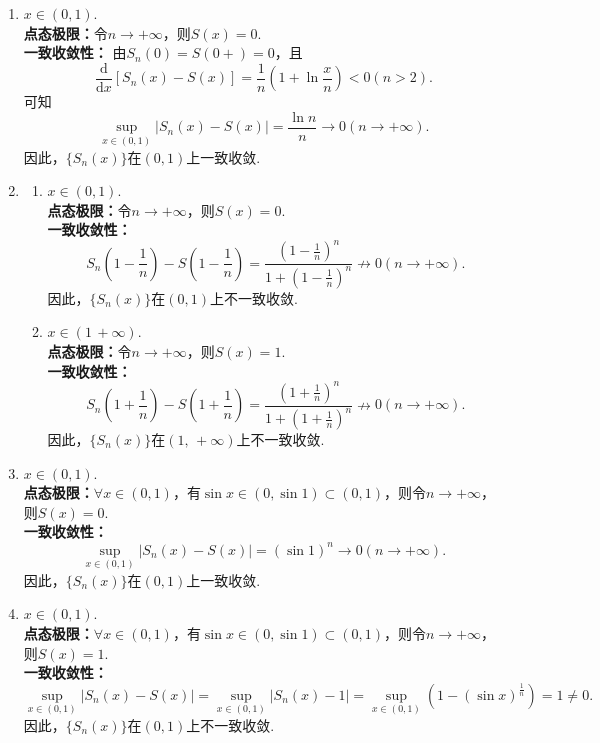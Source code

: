 \begin{enumerate}
\begin{solution}
\begin{enumerate}
        \item 
        $x\in(0,1).$\\
        \textbf{点态极限：}令$n\to+\infty$，则$S(x)=0$.\\
        \textbf{一致收敛性：}
        由$S_n(0)=S(0+)=0$，且
        \[
        \frac{\mathrm{d}}{\mathrm{d}x}\left[S_n(x)-S(x)\right]=\frac{1}{n}\left(1+\ln\frac{x}{n}\right)<0(n>2).
        \]
        可知
        \[
        \sup_{x\in(0,1)}\left|S_n(x)-S(x)\right|=\frac{\ln{n}}{n}\to 0(n\to+\infty).
        \]
        因此，$\{S_n(x)\}$在$(0,1)$上一致收敛.

        \item 
        \begin{enumerate}
        \item[i.] $x\in(0,1).$\\
        \textbf{点态极限：}令$n\to+\infty$，则$S(x)=0$.\\
        \textbf{一致收敛性：}
        \[
        S_n(1-\frac{1}{n})-S(1-\frac{1}{n})=\frac{\left(1-\frac{1}{n}\right)^n}{1+\left(1-\frac{1}{n}\right)^n}\nrightarrow 0(n\to+\infty).
        \]
        因此，$\{S_n(x)\}$在$(0,1)$上不一致收敛.
        \item[ii.] $x\in(1\,+\infty).$\\
        \textbf{点态极限：}令$n\to+\infty$，则$S(x)=1$.\\
        \textbf{一致收敛性：}	
        \[
        S_n(1+\frac{1}{n})-S(1+\frac{1}{n})=\frac{\left(1+\frac{1}{n}\right)^n}{1+\left(1+\frac{1}{n}\right)^n}\nrightarrow 0(n\to+\infty).
        \]
        因此，$\{S_n(x)\}$在$(1,\,+\infty)$上不一致收敛.
        \end{enumerate}

        \item 
        $x\in(0,1).$\\
        \textbf{点态极限：}$\forall x\in(0,1)$，有$\sin{x}\in(0,\sin{1})\subset (0,1)$，则令$n\to+\infty$，则$S(x)=0$.\\	
        \textbf{一致收敛性：}
        \[
        \sup_{x\in(0,1)}\left|S_n(x)-S(x)\right|=\left(\sin{1}\right)^n\to 0(n\to+\infty).
        \]
        因此，$\{S_n(x)\}$在$(0,1)$上一致收敛.

        \item 
        $x\in(0,1).$\\
        \textbf{点态极限：}$\forall x\in(0,1)$，有$\sin{x}\in(0,\sin{1})\subset (0,1)$，则令$n\to+\infty$，则$S(x)=1$.\\	
        \textbf{一致收敛性：}
        \[
        \sup_{x\in(0,1)}\left|S_n(x)-S(x)\right|=\sup_{x\in(0,1)}\left|S_n(x)-1\right|=\sup_{x\in(0,1)}\left(1-\left(\sin{x}\right)^{\frac{1}{n}}\right)=1\neq 0.
        \]
        因此，$\{S_n(x)\}$在$(0,1)$上不一致收敛.


\end{enumerate}
\end{solution}
\end{enumerate}
